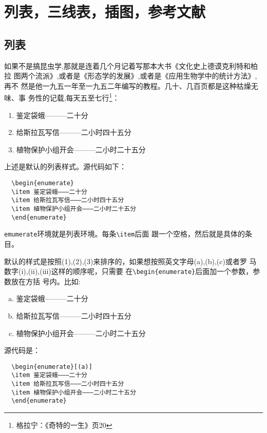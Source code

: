 ﻿%

\chapter{列表，三线表，插图，参考文献}
\label{chap02}

\section{列表}
\label{sec:23}

如果不是搞昆虫学,那就是连着几个月记着写那本大书《文化史上德谟克利特和柏拉
图两个流派》,或者是《形态学的发展》,或者是《应用生物学中的统计方法》,再不
然是他一九五一年至一九五二年编写的教程。几十、几百页都是这种枯燥无味、事
务性的记载,每天五至七行\footnote{格拉宁：《奇特的一生》页20}：
\begin{enumerate}
\item 鉴定袋蛾———二十分
\item 给斯拉瓦写信———二小时四十五分
\item 植物保护小组开会———二小时二十五分
\end{enumerate}

上述是默认的列表样式。源代码如下：
\begin{lstlisting}
  \begin{enumerate}
  \item 鉴定袋蛾———二十分
  \item 给斯拉瓦写信———二小时四十五分
  \item 植物保护小组开会———二小时二十五分
  \end{enumerate}
\end{lstlisting}

\texttt{emumerate}环境就是列表环境。每条\texttt{\textbackslash{item}}后面
跟一个空格，然后就是具体的条目。

默认的样式是按照(1),(2),(3)来排序的，如果想按照英文字母(a),(b),(c)或者罗
马数字(i),(ii),(iii)这样的顺序呢，只需要
在\texttt{\textbackslash{begin}\{enumerate\}}后面加一个参数，参数放在方括
号内。比如:
\begin{enumerate}[(a)]
\item 鉴定袋蛾———二十分
\item 给斯拉瓦写信———二小时四十五分
\item 植物保护小组开会———二小时二十五分
\end{enumerate}
源代码是：
\begin{lstlisting}
  \begin{enumerate}[(a)]
  \item 鉴定袋蛾———二十分
  \item 给斯拉瓦写信———二小时四十五分
  \item 植物保护小组开会———二小时二十五分
  \end{enumerate}
\end{lstlisting}

